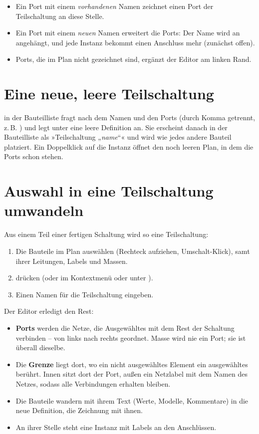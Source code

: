 \begin{itemize}
  \item Ein Port mit einem \emph{vorhandenen} Namen zeichnet einen Port der
    Teilschaltung an diese Stelle.
  \item Ein Port mit einem \emph{neuen} Namen erweitert die Ports: Der Name
    wird an  angehängt, und jede Instanz bekommt einen
    Anschluss mehr (zunächst offen).
  \item Ports, die im Plan nicht gezeichnet sind, ergänzt der Editor am
    linken Rand.
\end{itemize}

\section{Eine neue, leere Teilschaltung}

 in der Bauteilliste fragt nach dem Namen
und den Ports (durch Komma getrennt, z.\,B. ) und legt
unter  eine leere Definition an. Sie erscheint danach in
der Bauteilliste als »Teilschaltung „\textit{name}“« und wird wie jedes
andere Bauteil platziert. Ein Doppelklick auf die Instanz öffnet den noch
leeren Plan, in dem die Ports schon stehen.

\section{Auswahl in eine Teilschaltung umwandeln}
\label{sec:auslagern}

Aus einem Teil einer fertigen Schaltung wird so eine Teilschaltung:

\begin{enumerate}
  \item Die Bauteile im Plan auswählen (Rechteck aufziehen,
    Umschalt-Klick), samt ihrer Leitungen, Labels und Massen.
  \item {} drücken (oder  im Kontextmenü oder unter ).
  \item Einen Namen für die Teilschaltung eingeben.
\end{enumerate}

Der Editor erledigt den Rest:

\begin{itemize}
  \item \textbf{Ports} werden die Netze, die Ausgewähltes mit dem Rest der
    Schaltung verbinden – von links nach rechts geordnet. Masse wird nie ein
    Port; sie ist überall dieselbe.
  \item Die \textbf{Grenze} liegt dort, wo ein nicht ausgewähltes Element
    ein ausgewähltes berührt. Innen sitzt dort der Port, außen ein Netzlabel
    mit dem Namen des Netzes, sodass alle Verbindungen erhalten bleiben.
  \item Die Bauteile wandern mit ihrem Text (Werte, Modelle, Kommentare)
    in die neue Definition, die Zeichnung mit ihnen.
  \item An ihrer Stelle steht eine Instanz mit Labels an den Anschlüssen.
\end{itemize}

